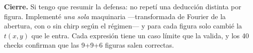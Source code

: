 \documentclass[11pt,a4paper]{article}
\begin{document}
\vspace{4pt}
\begin{decir}
\textbf{Cierre.} Si tengo que resumir la defensa: no repetí una deducción distinta
por figura. Implementé \emph{una sola} maquinaria ---transformada de Fourier de la
abertura, con o sin chirp según el régimen--- y para cada figura solo cambié la
$t(x,y)$ que le entra. Cada expresión tiene un caso límite que la valida, y los 40
checks confirman que las 9+9+6 figuras salen correctas.
\end{decir}
\end{document}
